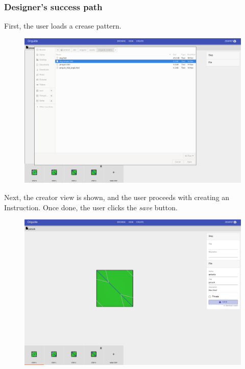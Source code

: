 \subsubsection{Designer's success path}

First, the user loads a crease pattern.

\begin{figure}[H]
  	\centering
    \includegraphics[width=\textwidth]{assets/5-designerLoad.png}
\end{figure}

Next, the creator view is shown, and the user proceeds with creating an Instruction.
Once done, the user clicks the \textit{save} button.

\begin{figure}[H]
  	\centering
    \includegraphics[width=\textwidth]{assets/5-designerSave.png}
\end{figure}

